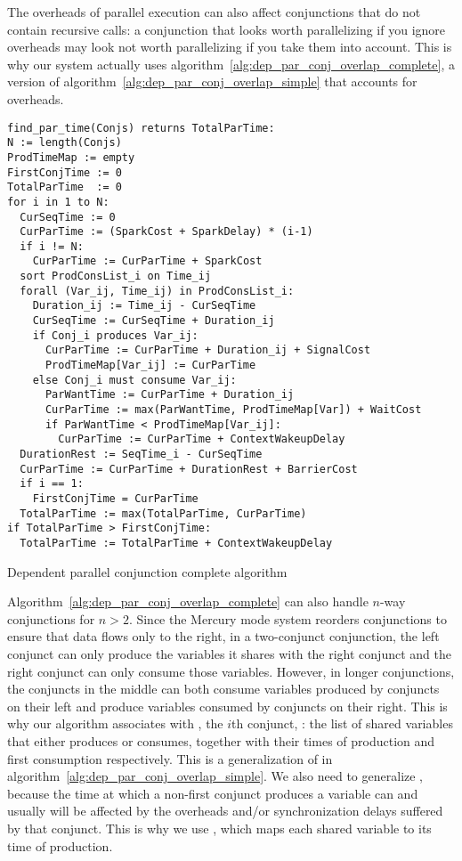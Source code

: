 The overheads of parallel execution can also affect conjunctions
that do not contain recursive calls:
a conjunction that looks worth parallelizing if you ignore overheads
may look not worth parallelizing if you take them into account.
This is why our system actually uses
algorithm~\ref{alg:dep_par_conj_overlap_complete},
a version of algorithm~\ref{alg:dep_par_conj_overlap_simple}
that accounts for overheads.

\begin{algorithm}
\begin{verbatim}
find_par_time(Conjs) returns TotalParTime:
N := length(Conjs)
ProdTimeMap := empty
FirstConjTime := 0
TotalParTime  := 0
for i in 1 to N:
  CurSeqTime := 0
  CurParTime := (SparkCost + SparkDelay) * (i-1)
  if i != N:
    CurParTime := CurParTime + SparkCost
  sort ProdConsList_i on Time_ij
  forall (Var_ij, Time_ij) in ProdConsList_i:
    Duration_ij := Time_ij - CurSeqTime
    CurSeqTime := CurSeqTime + Duration_ij
    if Conj_i produces Var_ij:
      CurParTime := CurParTime + Duration_ij + SignalCost
      ProdTimeMap[Var_ij] := CurParTime
    else Conj_i must consume Var_ij:
      ParWantTime := CurParTime + Duration_ij
      CurParTime := max(ParWantTime, ProdTimeMap[Var]) + WaitCost
      if ParWantTime < ProdTimeMap[Var_ij]:
        CurParTime := CurParTime + ContextWakeupDelay
  DurationRest := SeqTime_i - CurSeqTime
  CurParTime := CurParTime + DurationRest + BarrierCost
  if i == 1:
    FirstConjTime = CurParTime
  TotalParTime := max(TotalParTime, CurParTime)
if TotalParTime > FirstConjTime:
  TotalParTime := TotalParTime + ContextWakeupDelay
\end{verbatim}
\caption{Dependent parallel conjunction complete algorithm}
\label{alg:dep_par_conj_overlap_complete}
\end{algorithm}

Algorithm~\ref{alg:dep_par_conj_overlap_complete}
can also handle $n$-way conjunctions for $n>2$.
Since the Mercury mode system reorders conjunctions
to ensure that data flows only to the right,
in a two-conjunct conjunction,
the left conjunct can only produce
the variables it shares with the right conjunct
and the right conjunct can only consume
those variables.
However, in longer conjunctions,
the conjuncts in the middle
can both consume variables produced by conjuncts on their left
and produce variables consumed by conjuncts on their right.
This is why our algorithm associates with , the $i$th conjunct,
:
the list of shared variables that  either produces or consumes,
together with their times of production and first consumption respectively.
This is a generalization of  in
algorithm~\ref{alg:dep_par_conj_overlap_simple}.
We also need to generalize ,
because the time at which a non-first conjunct produces a variable
can and usually will be affected
by the overheads and/or synchronization delays suffered by that conjunct.
This is why we use ,
which maps each shared variable to its time of production.

